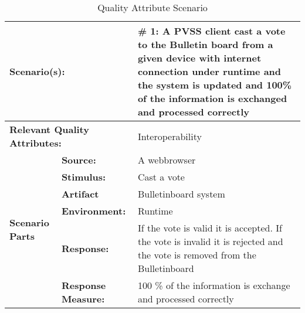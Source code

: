 \begin{table}[H]
\begin{center}
\begin{tabular}{|p{0.3cm}|p{2.5cm}|p{8cm}|}
  \hline
  \multicolumn{2}{|p{3cm}|}{\bfseries Scenario(s):} & \#  1: A PVSS client cast a vote to the Bulletin board from a given device with internet connection  under runtime and the system is updated and 100\% of the information is exchanged  and processed correctly\\
  \hline
  \multicolumn{2}{|p{3cm}|}{\bfseries Relevant Quality Attributes:} & Interoperability\\
  \hline
  \multirow{6}{*}{\begin{sideways}{\bfseries Scenario Parts}\end{sideways}}
  & {\bfseries Source:} & A webbrowser \\
  \cline{2-3}
  & {\bfseries Stimulus:} & Cast a vote \\
  \cline{2-3}
  & {\bfseries Artifact} &  Bulletinboard system \\
  \cline{2-3}
  & {\bfseries Environment:} &  Runtime \\
  \cline{2-3}
  & {\bfseries Response:} &  If the vote is valid it is accepted. If the vote is invalid it is rejected and the vote is removed from the Bulletinboard \\
  \cline{2-3}
  & {\bfseries Response Measure:} & 100 \% of the information is exchange and processed correctly \\
  \hline
\end{tabular}
\caption{Quality Attribute Scenario}
\end{center}
\end{table}


